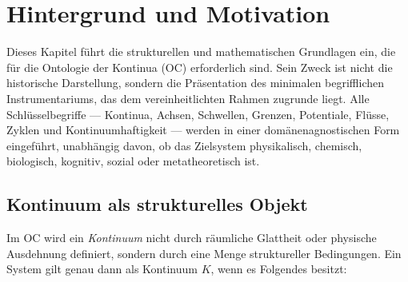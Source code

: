\section{Hintergrund und Motivation}
\label{sec:background}

Dieses Kapitel führt die strukturellen und mathematischen Grundlagen ein, die für die Ontologie der Kontinua (OC) erforderlich sind.
Sein Zweck ist nicht die historische Darstellung, sondern die Präsentation des minimalen begrifflichen Instrumentariums, das dem vereinheitlichten Rahmen zugrunde liegt.
Alle Schlüsselbegriffe --- Kontinua, Achsen, Schwellen, Grenzen, Potentiale, Flüsse, Zyklen und Kontinuumhaftigkeit --- werden in einer domänenagnostischen Form eingeführt, unabhängig davon, ob das Zielsystem physikalisch, chemisch, biologisch, kognitiv, sozial oder metatheoretisch ist.

\subsection{Kontinuum als strukturelles Objekt}

Im OC wird ein \emph{Kontinuum} nicht durch räumliche Glattheit oder physische Ausdehnung definiert, sondern durch eine Menge struktureller Bedingungen.
Ein System gilt genau dann als Kontinuum \(K\), wenn es Folgendes besitzt:

